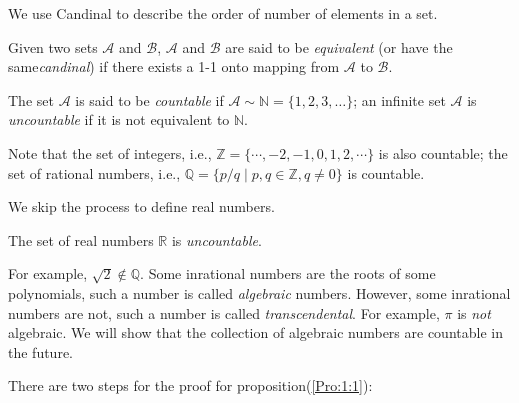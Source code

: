 We use Candinal to describe the order of number of elements in a set. 
\begin{definition}
Given two sets $\mathcal{A}$ and $\mathcal{B}$, $\mathcal{A}$ and $\mathcal{B}$ are said to be \emph{equivalent} (or have the same\emph{candinal}) if there exists a 1-1 onto mapping from $\mathcal{A}$ to $\mathcal{B}$.
\end{definition}
\begin{definition}[Countability]
The set $\mathcal{A}$ is said to be \emph{countable} if $\mathcal{A}\sim\mathbb{N}=\{1,2,3,\dots\}$; an infinite set $\mathcal{A}$ is \emph{uncountable} if it is not equivalent to $\mathbb{N}$.
\end{definition}
\begin{remark}
Note that the set of integers, i.e., $\mathbb{Z}=\{\cdots,-2,-1,0,1,2,\cdots\}$ is also countable; the set of rational numbers, i.e., $\mathbb{Q}=\{p/q\mid p,q\in\mathbb{Z}, q\ne0\}$ is countable.
\end{remark}
We skip the process to define real numbers.
\begin{proposition}\label{Pro:1:1}
The set of real numbers $\mathbb{R}$ is \emph{uncountable}.
\end{proposition}
For example, $\sqrt{2}\notin\mathbb{Q}$. Some inrational numbers are the roots of some polynomials, such a number is called \emph{algebraic} numbers. However, some inrational numbers are not, such a number is called \emph{transcendental}. For example, $\pi$ is \emph{not} algebraic. We will show that the collection of algebraic numbers are countable in the future.

There are two steps for the proof for proposition(\ref{Pro:1:1}):

